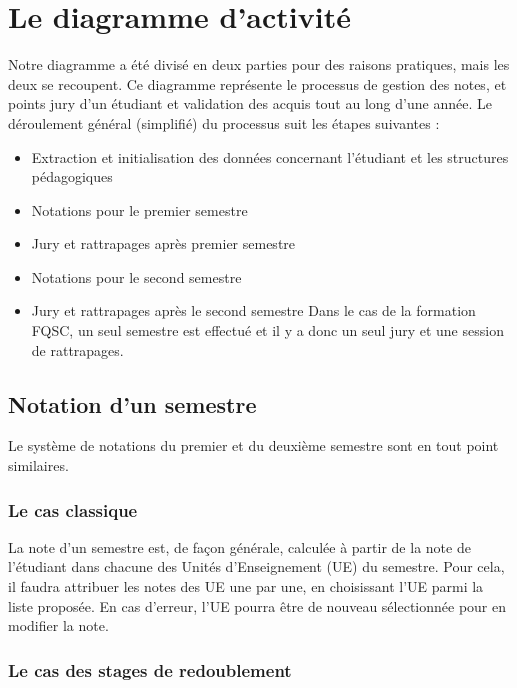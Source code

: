 \documentclass[letter, 11pt] {article}
\begin{document}
		\newpage
	
	\section{Le diagramme d'activité}
	
	Notre diagramme a été divisé en deux parties pour des raisons pratiques, mais les deux se recoupent. Ce diagramme représente le processus de gestion des notes, et points jury d’un étudiant et validation des acquis tout au long d’une année. Le déroulement général (simplifié) du processus suit les étapes suivantes :
	\begin{itemize}
		\item{Extraction et initialisation des données concernant l’étudiant et les structures pédagogiques}
		\item{Notations pour le premier semestre}
		\item{Jury et rattrapages après premier semestre}
		\item{Notations pour le second semestre}
		\item{Jury et rattrapages après le second semestre}
		Dans le cas de la formation FQSC, un seul semestre est effectué et il y a donc un seul jury et une session de rattrapages.
	\end{itemize}
	
		\subsection{Notation d'un semestre}
		
		Le système de notations du premier et du deuxième semestre sont en tout point similaires. 

			\subsubsection*{Le cas classique}
			
		La note d’un semestre est, de façon générale, calculée à partir de la note de l’étudiant dans chacune des Unités d’Enseignement (UE) du semestre.
		Pour cela, il faudra attribuer les notes des UE une par une, en choisissant l’UE parmi la liste proposée. En cas d’erreur, l’UE pourra être de nouveau sélectionnée pour en modifier la note.

			\subsubsection*{Le cas des stages de redoublement}
			
\end{document}
